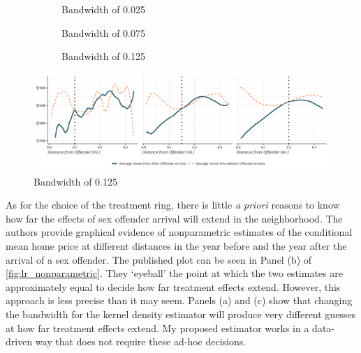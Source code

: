 \begin{figure}[htb!]
    \caption{Price Gradient of Distance from Offender}\label{fig:lr_nonparametric}

    \begin{subfigure}{0.33\textwidth}
        \caption{Bandwidth of 0.025}
    \end{subfigure}
    \begin{subfigure}{0.33\textwidth}
        \caption{Bandwidth of 0.075}
    \end{subfigure}
    \begin{subfigure}{0.33\textwidth}
        \caption{Bandwidth of 0.125}
    \end{subfigure}
    
    \vspace{-3mm}
    \includegraphics[width=\textwidth]{figures/geocoded/linden_rockoff_nonparametric.pdf}
    

\end{figure}

As for the choice of the treatment ring, there is little \textit{a priori} reasons to know how far the effects of sex offender arrival will extend in the neighborhood. The authors provide graphical evidence of nonparametric estimates of the conditional mean home price at different distances in the year before and the year after the arrival of a sex offender. The published plot can be seen in Panel (b) of \autoref{fig:lr_nonparametric}. They `eyeball' the point at which the two estimates are approximately equal to decide how far treatment effects extend. However, this approach is less precise than it may seem. Panels (a) and (c) show that changing the bandwidth for the kernel density estimator will produce very different guesses at how far treatment effects extend. My proposed estimator works in a data-driven way that does not require these ad-hoc decisions.

